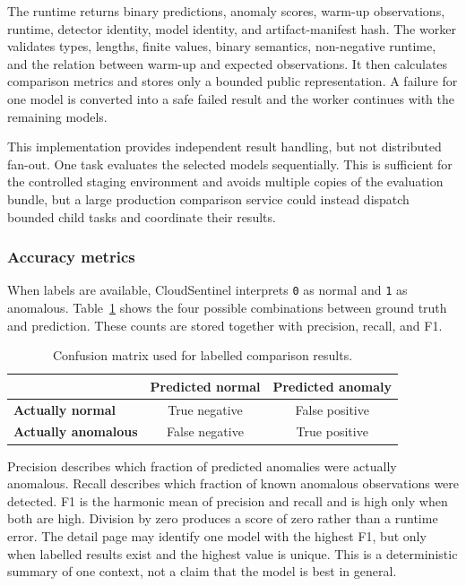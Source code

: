The runtime returns binary predictions, anomaly scores, warm-up observations, runtime, detector identity, model identity, and artifact-manifest hash. The worker validates types, lengths, finite values, binary semantics, non-negative runtime, and the relation between warm-up and expected observations. It then calculates comparison metrics and stores only a bounded public representation. A failure for one model is converted into a safe failed result and the worker continues with the remaining models.

This implementation provides independent result handling, but not distributed fan-out. One task evaluates the selected models sequentially. This is sufficient for the controlled staging environment and avoids multiple copies of the evaluation bundle, but a large production comparison service could instead dispatch bounded child tasks and coordinate their results.

\subsubsection{Accuracy metrics}

When labels are available, CloudSentinel interprets \texttt{0} as normal and \texttt{1} as anomalous. Table~\ref{tab:comparison_confusion_matrix} shows the four possible combinations between ground truth and prediction. These counts are stored together with precision, recall, and F1.

\begin{table}[H]
    \centering
    \caption{Confusion matrix used for labelled comparison results.}
    \label{tab:comparison_confusion_matrix}
    \begin{tabular}{@{}lcc@{}}
        \toprule
        & \textbf{Predicted normal} & \textbf{Predicted anomaly} \\
        \midrule
        \textbf{Actually normal} & True negative & False positive \\
        \textbf{Actually anomalous} & False negative & True positive \\
        \bottomrule
    \end{tabular}
\end{table}

Precision describes which fraction of predicted anomalies were actually anomalous. Recall describes which fraction of known anomalous observations were detected. F1 is the harmonic mean of precision and recall and is high only when both are high. Division by zero produces a score of zero rather than a runtime error. The detail page may identify one model with the highest F1, but only when labelled results exist and the highest value is unique. This is a deterministic summary of one context, not a claim that the model is best in general.

